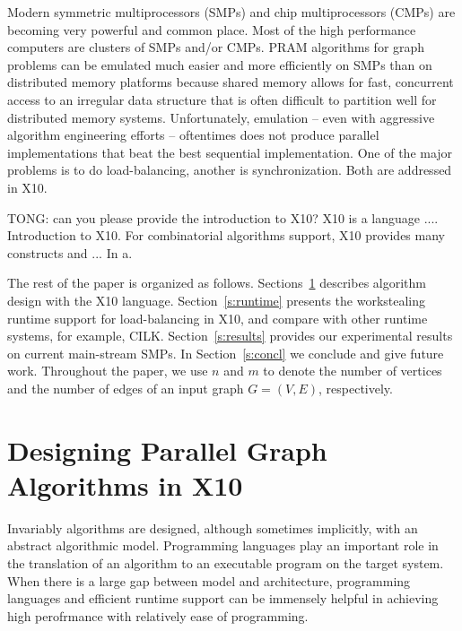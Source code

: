 \documentclass{llncs}
\begin{document}
 Modern symmetric multiprocessors (SMPs) and chip multiprocessors (CMPs) 
 are becoming very powerful and common place. Most of the high performance
 computers are clusters of SMPs and/or CMPs. PRAM algorithms for graph problems can be emulated much easier and more
 efficiently on SMPs than on distributed memory platforms because shared memory allows for fast, concurrent access
to an irregular data structure that is often difficult to partition well for distributed memory systems. 
 Unfortunately, emulation -- even with aggressive algorithm engineering efforts --
 oftentimes does not produce parallel implementations that beat the
 best sequential implementation. One of the major problems is to do load-balancing, another is synchronization. Both are addressed in X10.
 
 {TONG: can you please provide the introduction to X10}? X10 is a language .... Introduction to X10.  For combinatorial algorithms support, X10 provides many constructs and ...
 In a.   

 The rest of the paper is organized as follows. Sections~\ref{s:design} describes algorithm design with the X10 language.
 Section~\ref{s:runtime} presents the workstealing runtime support for load-balancing in X10, and compare with other runtime systems, for example, CILK. 
 Section~\ref{s:results} provides our experimental results on current main-stream SMPs.
 In Section~\ref{s:concl} we conclude and give future work. 
 Throughout the paper, we
 use $n$ and $m$ to denote the number of vertices and the number of
 edges of an input graph $G=(V,E)$, respectively. 
  

\section{Designing Parallel Graph Algorithms in X10}
\label{s:design}

 Invariably algorithms are designed, although sometimes implicitly, with an abstract algorithmic model. Programming languages play an important role in the translation of an algorithm to an executable program on the target system. When there is a large gap between model and architecture, programming languages and efficient runtime support can be immensely helpful in achieving high perofrmance with relatively ease of programming. 
\end{document}
